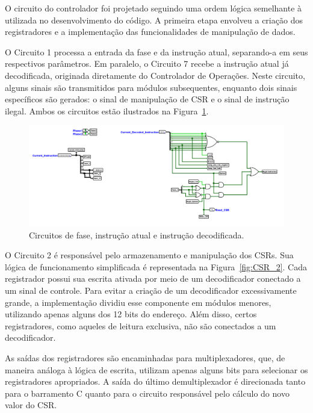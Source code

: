 \documentclass[
	12pt,				%
	openright,			%
	oneside,			%
	a4paper,			%
	english,			%
	french,				%
	spanish,			%
	brazil,				%
	]{abntex2}
\begin{document}
O circuito do controlador foi projetado seguindo uma ordem lógica semelhante à utilizada no desenvolvimento do código. A primeira etapa envolveu a criação dos registradores e a implementação das funcionalidades de manipulação de dados.

O Circuito 1 processa a entrada da fase e da instrução atual, separando-a em seus respectivos parâmetros. Em paralelo, o Circuito 7 recebe a instrução atual já decodificada, originada diretamente do Controlador de Operações. Neste circuito, alguns sinais são transmitidos para módulos subsequentes, enquanto dois sinais específicos são gerados: o sinal de manipulação de CSR e o sinal de instrução ilegal. Ambos os circuitos estão ilustrados na Figura~\ref{fig:CSR_1_7}.

\begin{figure}[h]
    \centering
    \includegraphics[width=1\linewidth]{ProcessoDesenvolvimento/Arquitetura/CSR_1_7.png}
    \caption{Circuitos de fase, instrução atual e instrução decodificada.}
    \label{fig:CSR_1_7}
\end{figure}

O Circuito 2 é responsável pelo armazenamento e manipulação dos CSRs. Sua lógica de funcionamento simplificada é representada na Figura~\ref{fig:CSR_2}. Cada registrador possui sua escrita ativada por meio de um decodificador conectado a um sinal de controle. Para evitar a criação de um decodificador excessivamente grande, a implementação dividiu esse componente em módulos menores, utilizando apenas alguns dos 12 bits do endereço. Além disso, certos registradores, como aqueles de leitura exclusiva, não são conectados a um decodificador.

As saídas dos registradores são encaminhadas para multiplexadores, que, de maneira análoga à lógica de escrita, utilizam apenas alguns bits para selecionar os registradores apropriados. A saída do último demultiplexador é direcionada tanto para o barramento C quanto para o circuito responsável pelo cálculo do novo valor do CSR.
\end{document}
